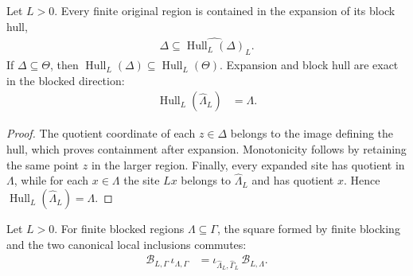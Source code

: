 \begin{lemma}
    \label{lem:qca_block_hull_properties}
    \leanok
    Let $L>0$.  Every finite original region is contained in the expansion of
    its block hull,
    \begin{align}
        \Delta\subseteq
        \widehat{\operatorname{Hull}_L(\Delta)}_L.
    \end{align}
    If $\Delta\subseteq\Theta$, then
    $\operatorname{Hull}_L(\Delta)\subseteq
        \operatorname{Hull}_L(\Theta)$.  Expansion and block hull are exact in the
    blocked direction:
    \begin{align}
        \operatorname{Hull}_L(\widehat\Lambda_L) & =\Lambda.
    \end{align}
\end{lemma}

\begin{proof}\leanok
    The quotient coordinate of each $z\in\Delta$ belongs to the image defining
    the hull, which proves containment after expansion.  Monotonicity follows
    by retaining the same point $z$ in the larger region.  Finally, every
    expanded site has quotient in $\Lambda$, while for each $x\in\Lambda$ the
    site $Lx$ belongs to $\widehat\Lambda_L$ and has quotient $x$.  Hence
    $\operatorname{Hull}_L(\widehat\Lambda_L)=\Lambda$.
\end{proof}

\begin{lemma}
    \label{lem:qca_local_blocking_inclusion}
    \leanok
    Let $L>0$.  For finite blocked regions $\Lambda\subseteq\Gamma$, the
    square formed by finite blocking and the two canonical local inclusions
    commutes:
    \begin{align}
        \mathcal B_{L,\Gamma}\,\iota_{\Lambda,\Gamma}
         & =\iota_{\widehat\Lambda_L,\widehat\Gamma_L}\,
        \mathcal B_{L,\Lambda}.
    \end{align}
\end{lemma}

